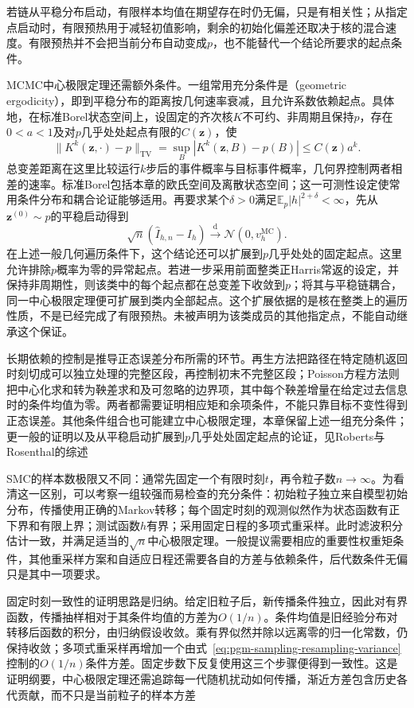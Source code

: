 若链从平稳分布启动，有限样本均值在期望存在时仍无偏，只是有相关性；从指定点启动时，有限预热用于减轻初值影响，剩余的初始化偏差还取决于核的混合速度。有限预热并不会把当前分布自动变成$p$，也不能替代一个结论所要求的起点条件。

MCMC中心极限定理还需额外条件。一组常用充分条件是（geometric ergodicity），即到平稳分布的距离按几何速率衰减，且允许系数依赖起点。具体地，在标准Borel状态空间上，设固定的齐次核$K$不可约、非周期且保持$p$，存在$0<a<1$及对$p$几乎处处起点有限的$C(\bm z)$，使
\[
  \lVert K^k(\bm z,\cdot)-p\rVert_{\mathrm{TV}}
    =\sup_B|K^k(\bm z,B)-p(B)|\leq C(\bm z)a^k.
\]
总变差距离在这里比较运行$k$步后的事件概率与目标事件概率，几何界控制两者相差的速率。标准Borel包括本章的欧氏空间及离散状态空间；这一可测性设定使常用条件分布和耦合论证能够适用。再要求某个$\delta>0$满足$\mathbb{E}_p|h|^{2+\delta}<\infty$，先从$\bm z^{(0)}\sim p$的平稳启动得到
\[
  \sqrt n(\widehat I_{h,n}-I_h)
     \xrightarrow{\mathrm{d}}\mathcal{N}(0,v_h^{\mathrm{MC}}).
\]
在上述一般几何遍历条件下，这个结论还可以扩展到$p$几乎处处的固定起点。这里允许排除$p$概率为零的异常起点。若进一步采用前面整类正Harris常返的设定，并保持非周期性，则该类中的每个起点都在总变差下收敛到$p$；将其与平稳链耦合，同一中心极限定理便可扩展到类内全部起点。这个扩展依据的是核在整类上的遍历性质，不是已经完成了有限预热。未被声明为该类成员的其他指定点，不能自动继承这个保证。

长期依赖的控制是推导正态误差分布所需的环节。再生方法把路径在特定随机返回时刻切成可以独立处理的完整区段，再控制初末不完整区段；Poisson方程方法则把中心化求和转为鞅差求和及可忽略的边界项，其中每个鞅差增量在给定过去信息时的条件均值为零。两者都需要证明相应矩和余项条件，不能只靠目标不变性得到正态误差。其他条件组合也可能建立中心极限定理，本章保留上述一组充分条件；更一般的证明以及从平稳启动扩展到$p$几乎处处固定起点的论证，见Roberts与Rosenthal的综述

SMC的样本数极限又不同：通常先固定一个有限时刻$t$，再令粒子数$n\to\infty$。为看清这一区别，可以考察一组较强而易检查的充分条件：初始粒子独立来自模型初始分布，传播使用正确的Markov转移；每个固定时刻的观测似然作为状态函数有正下界和有限上界；测试函数$h$有界；采用固定日程的多项式重采样。此时滤波积分估计一致，并满足适当的$\sqrt n$中心极限定理。一般提议需要相应的重要性权重矩条件，其他重采样方案和自适应日程还需要各自的方差与依赖条件，后代数条件无偏只是其中一项要求。

固定时刻一致性的证明思路是归纳。给定旧粒子后，新传播条件独立，因此对有界函数，传播抽样相对于其条件均值的方差为$O(1/n)$。条件均值是旧经验分布对转移后函数的积分，由归纳假设收敛。乘有界似然并除以远离零的归一化常数，仍保持收敛；多项式重采样再增加一个由式~\eqref{eq:pgm-sampling-resampling-variance}控制的$O(1/n)$条件方差。固定步数下反复使用这三个步骤便得到一致性。这是证明纲要，中心极限定理还需追踪每一代随机扰动如何传播，渐近方差包含历史各代贡献，而不只是当前粒子的样本方差

